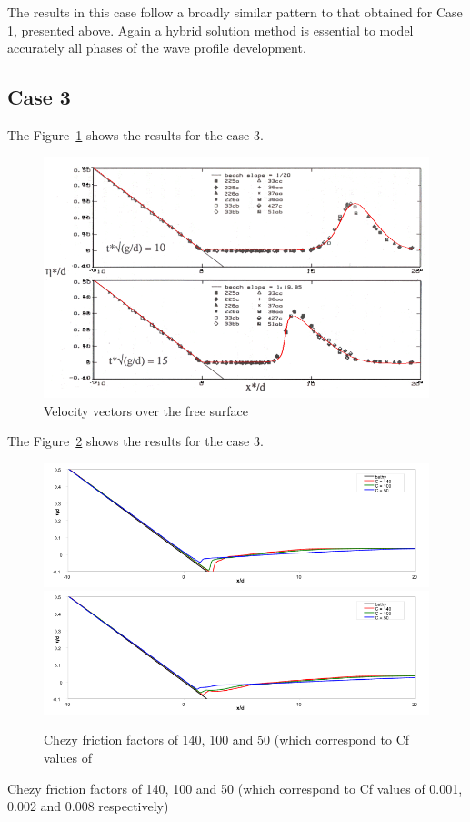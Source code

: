 The results in this case follow a broadly similar pattern to that obtained for
Case 1, presented above.  Again a hybrid solution method is essential to model
accurately all phases of the wave profile development.

\subsection{Case 3}

The Figure~\ref{fig:tests:case3} shows the results for the case 3.
\begin{figure}
\centering
\includegraphics[width=.6\textwidth]{img/case3.png}
\caption{Velocity vectors over the free surface}\label{fig:tests:case3}
\end{figure}


The Figure~\ref{fig:tests:chezy} shows the results for the case 3.
\begin{figure}
\centering
\includegraphics[width=.6\textwidth]{img/chezy1.png}
\includegraphics[width=.6\textwidth]{img/chezy2.png}
\caption{Chezy friction factors of 140, 100 and 50 (which correspond to Cf values of}\label{fig:tests:chezy}
\end{figure}

Chezy friction factors of 140, 100 and 50 (which correspond to Cf values of
0.001, 0.002 and 0.008 respectively)

